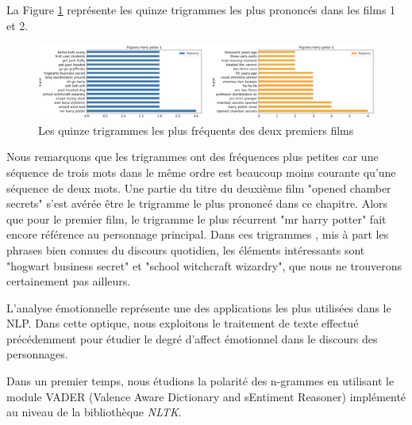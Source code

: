 \documentclass[11pt]{article}
\begin{document}
\begin{center}
La Figure \ref{trigrams} représente les quinze trigrammes les plus prononcés dans les films 1 et 2.

\begin{figure}[hbt!]
    \includegraphics[width= 16cm, height= 7 cm]{./figures/trigrams.png}
    \caption{Les quinze trigrammes les plus fréquents des deux premiers films}
    \label{trigrams}
\end{figure}
\FloatBarrier

Nous remarquons que les trigrammes ont des fréquences plus petites car une séquence de trois mots dans le même ordre est beaucoup moins courante qu'une séquence de deux mots.
Une partie du titre du deuxième film "opened chamber secrets" s'est avérée être le trigramme le plus prononcé dans ce chapitre. Alors que pour le premier film, le trigramme le plus récurrent "mr harry potter" fait encore référence au personnage principal. Dans ces trigrammes , mis à part les phrases bien connues du discours quotidien, les éléments intéressants sont "hogwart business secret" et "school witchcraft wizardry", que nous ne trouverons certainement pas ailleurs.\par

L'analyse émotionnelle représente une des applications les plus utilisées dans le NLP. Dans cette optique, nous exploitons le traitement de texte effectué précédemment pour étudier le degré d'affect émotionnel dans le discours des personnages.\par

Dans un premier temps, nous étudions la polarité des n-grammes en utilisant le module VADER (Valence Aware Dictionary and sEntiment Reasoner) implémenté au niveau de la bibliothèque \textit{NLTK}.


\end{center}
\end{document}
